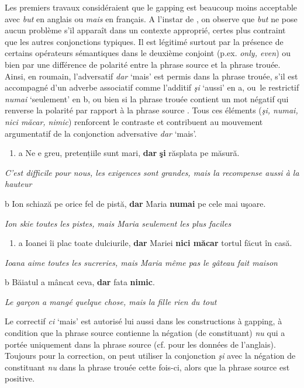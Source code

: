 Les premiers travaux considéraient que le gapping est beaucoup moins acceptable avec \textit{but} en anglais ou \textit{mais} en français. A l'instar de \citet{Repp2009}, on observe que \textit{but} ne pose aucun problème s'il apparaît dans un contexte approprié, certes plus contraint que les autres conjonctions typiques. Il est légitimé surtout par la présence de certains opérateurs sémantiques dans le deuxième conjoint (p.ex. \textit{only, even}) ou bien par une différence de polarité entre la phrase source et la phrase trouée. Ainsi, en roumain, l'adversatif \textit{dar} `mais' est permis dans la phrase trouée, s'il est accompagné d'un adverbe associatif comme l'additif \textit{şi} `aussi' en a, ou~le restrictif \textit{numai} `seulement' en b, ou bien si la phrase trouée contient un mot négatif qui renverse la polarité par rapport à la phrase source . Tous ces éléments (\textit{şi, numai, nici măcar, nimic}) renforcent le contraste et contribuent au mouvement argumentatif de la conjonction adversative \textit{dar} `mais'. 


\begin{enumerate}
\item \label{bkm:Ref289098401}a  Ne e greu, pretențiile sunt mari, \textbf{dar} \textbf{şi} răsplata pe măsură.


\end{enumerate}
{\itshape
C'est difficile pour nous, les exigences sont grandes, mais la recompense aussi à la hauteur } 

  b  Ion schiază pe orice fel de pistă, \textbf{dar} Maria \textbf{numai} pe cele mai uşoare.

{\itshape
Ion skie toutes les pistes, mais Maria seulement les plus faciles}


\begin{enumerate}
\item \label{bkm:Ref289098379}a  Ioanei îi plac toate dulciurile, \textbf{dar} Mariei \textbf{nici măcar} tortul făcut în casă.


\end{enumerate}
{\itshape
Ioana aime toutes les sucreries, mais Maria même pas le gâteau fait maison } 

  b  Băiatul a mâncat ceva, \textbf{dar} fata \textbf{nimic}.

{\itshape
Le garçon a mangé quelque chose, mais la fille rien du tout} 

Le correctif \textit{ci} `mais' est autorisé lui aussi dans les constructions à gapping, à condition que la phrase source contienne la négation (de constituant) \textit{nu} qui a portée uniquement dans la phrase source (cf. \citet{Toosarvandani2011} pour les données de l'anglais). Toujours pour la correction, on peut utiliser la conjonction \textit{şi} avec la négation de constituant \textit{nu} dans la phrase trouée cette fois-ci, alors que la phrase source est positive.


